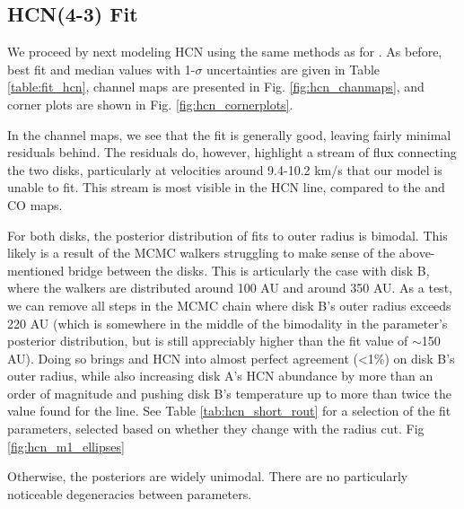 \subsection{HCN(4-3) Fit}
\label{subsection:hcn_fit}

We proceed by next modeling HCN using the same methods as for \hco. As before, best fit and median values with 1-$\sigma$  uncertainties are given in Table \ref{table:fit_hcn}, channel maps are presented in Fig. \ref{fig:hcn_chanmaps}, and corner plots are shown in Fig. \ref{fig:hcn_cornerplots}.

In the channel maps, we see that the fit is generally good, leaving fairly minimal residuals behind. The residuals do, however, highlight a stream of flux connecting the two disks, particularly at velocities around 9.4-10.2 km/s that our model is unable to fit. This stream is most visible in the HCN line, compared to the \hco and CO maps.

For both disks, the posterior distribution of fits to outer radius is bimodal. This likely is a result of the MCMC walkers struggling to make sense of the above-mentioned bridge between the disks. This is articularly the case with disk B, where the walkers are distributed around 100 AU and around 350 AU. As a test, we can remove all steps in the MCMC chain where disk B's outer radius exceeds 220 AU (which is somewhere in the middle of the bimodality in the parameter's posterior distribution, but is still appreciably higher than the \hco fit value of $\sim$150 AU). Doing so brings \hco and HCN into almost perfect agreement (\textless 1\%) on disk B's outer radius, while also increasing disk A's HCN abundance by more than an order of magnitude and pushing disk B's temperature up to more than twice the value found for the \hco line. See Table \ref{tab:hcn_short_rout} for a selection of the fit parameters, selected based on whether they change with the radius cut. Fig \ref{fig:hcn_m1_ellipses}

Otherwise, the posteriors are widely unimodal. There are no particularly noticeable degeneracies between parameters.



